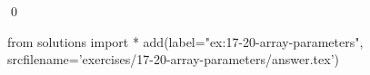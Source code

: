 
\begin{ex}
  \label{ex:17-20-array-parameters}
  
  \qed
\end{ex}
\begin{python0}
from solutions import *
add(label="ex:17-20-array-parameters",
    srcfilename='exercises/17-20-array-parameters/answer.tex')
\end{python0}
